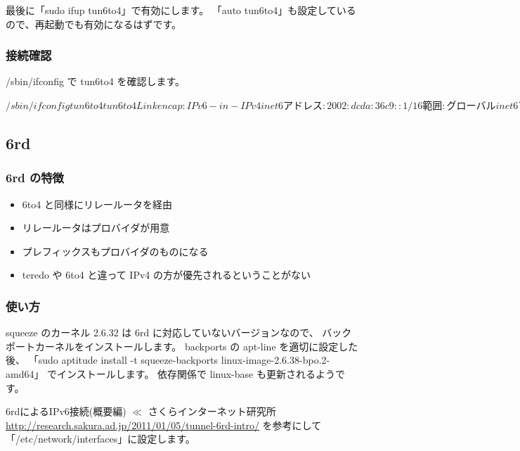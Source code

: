 \documentclass[mingoth,a4paper]{jsarticle}
\begin{document}
最後に「sudo ifup tun6to4」で有効にします。
「auto tun6to4」も設定しているので、再起動でも有効になるはずです。
\subsubsection{接続確認}

/sbin/ifconfig で tun6to4 を確認します。

\begin{commandline}
$ /sbin/ifconfig tun6to4
tun6to4   Link encap:IPv6-in-IPv4
          inet6アドレス: 2002:dcda:36c9::1/16 範囲:グローバル
          inet6アドレス: ::220.218.54.201/128 範囲:Compat
          UP RUNNING NOARP  MTU:1480  メトリック:1
          RXパケット:55939508 エラー:0 損失:0 オーバラン:0 フレーム:0
          TXパケット:84141144 エラー:1175 損失:0 オーバラン:0 キャリア:886
      衝突(Collisions):0 TXキュー長:0
          RXバイト:5470501110 (5.0 GiB)  TXバイト:88417369465 (82.3 GiB)

$
\end{commandline}
\subsection{6rd}
\subsubsection{6rd の特徴}


\begin{itemize}
\item 6to4 と同様にリレールータを経由
\item リレールータはプロバイダが用意
\item プレフィックスもプロバイダのものになる
\item teredo や 6to4 と違って IPv4 の方が優先されるということがない
\end{itemize}
\subsubsection{使い方}


squeeze のカーネル 2.6.32 は 6rd に対応していないバージョンなので、
バックポートカーネルをインストールします。
backports の apt-line を適切に設定した後、
「sudo aptitude install -t squeeze-backports linux-image-2.6.38-bpo.2-amd64」
でインストールします。
依存関係で linux-base も更新されるようです。

6rdによるIPv6接続(概要編) $\ll$ さくらインターネット研究所
\url{http://research.sakura.ad.jp/2011/01/05/tunnel-6rd-intro/}
を参考にして「/etc/network/interfaces」に設定します。
\end{document}
